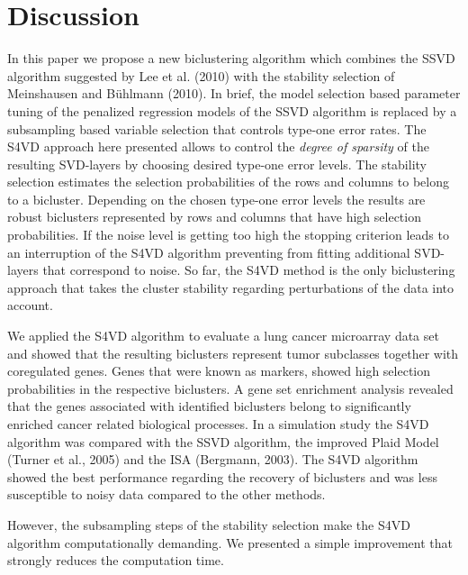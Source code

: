 \chapter{Discussion}
In this paper we propose a new biclustering algorithm which combines the SSVD algorithm suggested by Lee et al. (2010) with the stability selection of Meinshausen and B\"uhlmann (2010). In brief, the model selection based parameter tuning of the penalized regression models of the SSVD algorithm is replaced by a subsampling based variable selection that controls type-one error rates. The  S4VD approach here presented allows to control the \textit{degree of sparsity} of the resulting SVD-layers by choosing desired type-one error levels. The stability selection estimates the selection probabilities of the rows and columns to belong to a bicluster. %
Depending on the chosen type-one error levels the results are robust biclusters represented by rows and columns that have high selection probabilities. If the noise level is getting too high the stopping criterion leads to an interruption of the S4VD algorithm preventing from fitting additional SVD-layers that correspond to noise. %
So far, the S4VD method is the only biclustering approach that takes the cluster stability regarding perturbations of the data into account. 

We applied the S4VD algorithm to evaluate a lung cancer microarray data set and showed that the resulting biclusters represent tumor subclasses together with coregulated genes. Genes that were known as markers, showed high selection probabilities in the respective biclusters. A gene set enrichment analysis revealed that the genes associated with identified biclusters belong to significantly enriched cancer related biological processes. In a simulation study the S4VD algorithm was compared with the SSVD algorithm, the improved Plaid Model (Turner et al., 2005) and the ISA (Bergmann, 2003). The S4VD algorithm showed the best performance regarding the recovery of biclusters and was less susceptible to noisy data compared to the other methods. 

However, the subsampling steps of the stability selection make the S4VD algorithm computationally demanding. We presented a simple improvement that strongly reduces the computation time. 